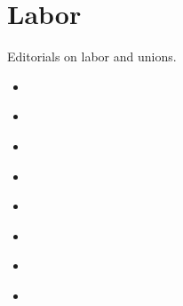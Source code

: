\documentclass[letterpaper,10pt,english]{jupyterBook}
\begin{document}
\section{Labor}
\label{\detokenize{Sections/labor:labor}}\label{\detokenize{Sections/labor::doc}}
\sphinxAtStartPar
Editorials on labor and unions.
\begin{itemize}
\item {} 
\sphinxAtStartPar
{\hyperref[\detokenize{Volumes/03/06/servant_in_the_south::doc}]{}}

\item {} 
\sphinxAtStartPar
{\hyperref[\detokenize{Volumes/15/05/the_black_man_and_the_unions::doc}]{}}

\item {} 
\sphinxAtStartPar
{\hyperref[\detokenize{Volumes/18/05/labor_omnia_vincit::doc}]{}}

\item {} 
\sphinxAtStartPar
{\hyperref[\detokenize{Volumes/28/04/american_federation_of_labor::doc}]{}}

\item {} 
\sphinxAtStartPar
{\hyperref[\detokenize{Volumes/31/02/black_man_and_labor::doc}]{}}

\item {} 
\sphinxAtStartPar
{\hyperref[\detokenize{Volumes/31/06/again_pullman_porters::doc}]{}}

\item {} 
\sphinxAtStartPar
{\hyperref[\detokenize{Volumes/39/09/employment::doc}]{}}

\item {} 
\sphinxAtStartPar
{\hyperref[\detokenize{Volumes/40/12/af_of_l::doc}]{}}

\end{itemize}
\end{document}
